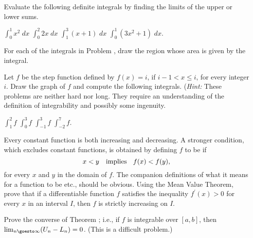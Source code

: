 \begin{exercises}

Evaluate the following definite integrals by finding the limits
of the upper or lower sums.
\begin{exenum}
\x
$\int_0^1 x^2 \; dx$
\x
$\int_0^2 2x \; dx$
\x
$\int_1^3 (x+1) \; dx$
\x
$\int_0^1 (3x^2 + 1) \; dx$.
\end{exenum}

For each of the integrals in Problem ,
draw the region whose area is given by the integral.

Let $f$ be the step function defined by
$f(x) = i$, if $i-1 < x \leq i$,
for every integer $i$.
Draw the graph of $f$ and compute the following integrals.
(\emph{Hint:} These problems are neither hard nor long.
They require an understanding of the definition of
integrability and possibly some ingenuity.
\begin{exenum}
\x
$\int_1^2 f$
\x
$\int_0^3 f$
\x
$\int_{-1}^3 f$
\x
$\int_{-2}^7 f$.
\end{exenum}

Every constant function is both increasing and decreasing.
A stronger condition, which excludes constant functions,
is obtained by defining $f$ to be  if
\[
x<y \quad \mbox{implies \; $f(x) < f(y)$}
,
\]
for every $x$ and $y$ in the domain of $f$.
The companion definitions of what it means for a function to be
 etc.,
should be obvious.
Using the Mean Value Theorem, prove that if a
differentiable function $f$ satisfies the inequality
$f^\prime(x)>0$ for every $x$ in an interval $I$,
then $f$ is strictly increasing on $I$.

Prove the converse of Theorem ;
i.e., if $f$ is integrable over $[a,b]$, then
$\lim_{n\goesto\infty} (U_n - L_n) = 0$.
(This is a difficult problem.)

\end{exercises}
